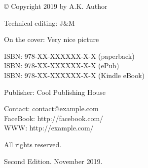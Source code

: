 {
\setlength{\parindent}{0pt}
\setlength{\parskip}{8pt}

© Copyright 2019 by A.K. Author

Technical editing: J\&M

On the cover: Very nice picture

ISBN: 978-XX-XXXXXX-X-X (paperback)\\
ISBN: 978-XX-XXXXXX-X-X (ePub)\\
ISBN: 978-XX-XXXXXX-X-X (Kindle eBook)

Publisher: Cool Publishing House

Contact: contact@example.com\\
FaceBook: http://facebook.com/\\
WWW: http://example.com/

All rights reserved.

Second Edition. November 2019.

}